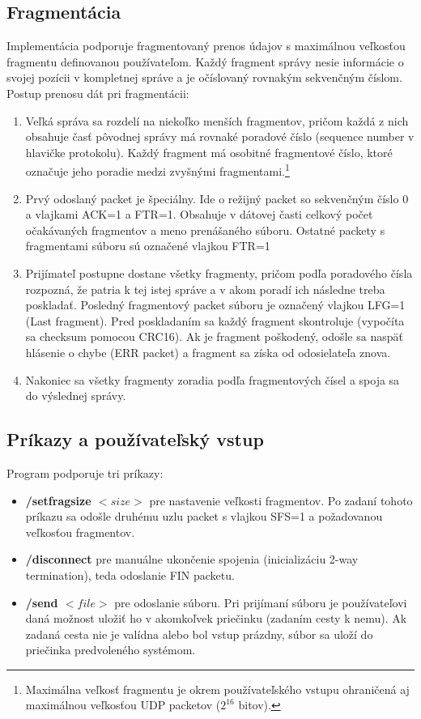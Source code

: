 \documentclass[a4paper,12pt]{article}
\begin{document}
    \subsection{Fragmentácia}\label{frag}
    Implementácia podporuje fragmentovaný prenos údajov s maximálnou veľkosťou fragmentu definovanou používateľom. Každý fragment správy nesie informácie o svojej pozícii v kompletnej správe a je očíslovaný rovnakým sekvenčným číslom. Postup prenosu dát pri fragmentácii:

	\begin{enumerate}
		\item Veľká správa sa rozdelí na niekoľko menších fragmentov, pričom každá z nich obsahuje časť pôvodnej správy má rovnaké poradové číslo (sequence number v hlavičke protokolu). Každý fragment má osobitné fragmentové číslo, ktoré označuje jeho poradie medzi zvyšnými fragmentami.\footnote{Maximálna veľkosť fragmentu je okrem používateľského vstupu ohraničená aj maximálnou veľkosťou UDP packetov (${2}^{16}$ bitov).}
		\item Prvý odoslaný packet je špeciálny. Ide o režijný packet so sekvenčným číslo 0 a vlajkami ACK=1 a FTR=1. Obsahuje v dátovej časti celkový počet očakávaných fragmentov a meno prenášaného súboru. Ostatné packety s fragmentami súboru sú označené vlajkou FTR=1
		\item Prijímateľ postupne dostane všetky fragmenty, pričom podľa poradového čísla rozpozná, že patria k tej istej správe a v akom poradí ich následne treba poskladať. Posledný fragmentový packet súboru je označený vlajkou LFG=1 (Last fragment). Pred poskladaním sa každý fragment skontroluje (vypočíta sa checksum pomocou CRC16). Ak je fragment poškodený, odošle sa naspäť hlásenie o chybe (ERR packet) a fragment sa získa od odosielateľa znova.
		\item Nakoniec sa všetky fragmenty zoradia podľa fragmentových čísel a spoja sa do výslednej správy.
	\end{enumerate}
    
     \subsection{Príkazy a používateľský vstup}
	Program podporuje tri príkazy:
	\begin{itemize}
		\item \textbf{/setfragsize $<size>$} pre nastavenie veľkosti fragmentov. Po zadaní tohoto príkazu sa odošle druhému uzlu packet s vlajkou SFS=1 a požadovanou veľkosťou fragmentov.
		\item \textbf{/disconnect} pre manuálne ukončenie spojenia (inicializáciu 2-way termination), teda odoslanie FIN packetu.
		\item \textbf{/send $<file>$} pre odoslanie súboru. Pri prijímaní súboru je používateľovi daná možnost uložiť ho v akomkoľvek priečinku (zadaním cesty k nemu). Ak zadaná cesta nie je valídna alebo bol vstup prázdny, súbor sa uloží do priečinka predvoleného systémom.
	\end{itemize}
  
\end{document}
